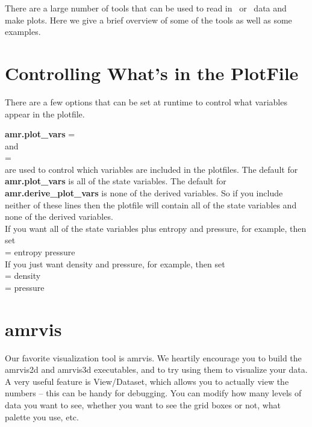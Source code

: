 There are a large number of tools that can be used to read in \castro\
or \boxlib\ data and make plots.  Here we give a brief overview of some
of the tools as well as some examples.

\section{Controlling What's in the PlotFile}

There are a few options that can be set at runtime to control what
variables appear in the plotfile.

{\bf amr.plot\_vars} = \\

\noindent and  \\

 = \\

\noindent are used to control which variables are included in the plotfiles.  The default for {\bf amr.plot\_vars}
is all of the state variables.  The default for {\bf amr.derive\_plot\_vars} is none of
the derived variables.  So if you include neither of these lines then the plotfile
will contain all of the state variables and none of the derived variables. \\

\noindent If you want all of the state variables plus entropy and pressure, for example, then set \\

 = entropy pressure \\

\noindent If you just want density and pressure, for example, then set \\

 =  density \\

 = pressure \\



\section{amrvis}
Our favorite visualization tool is amrvis. We heartily encourage you
to build the amrvis2d and amrvis3d executables, and to try using them
to visualize your data. A very useful feature is View/Dataset, which
allows you to actually view the numbers -- this can be handy for
debugging. You can modify how many levels of data you want to see,
whether you want to see the grid boxes or not, what palette you use,
etc.


